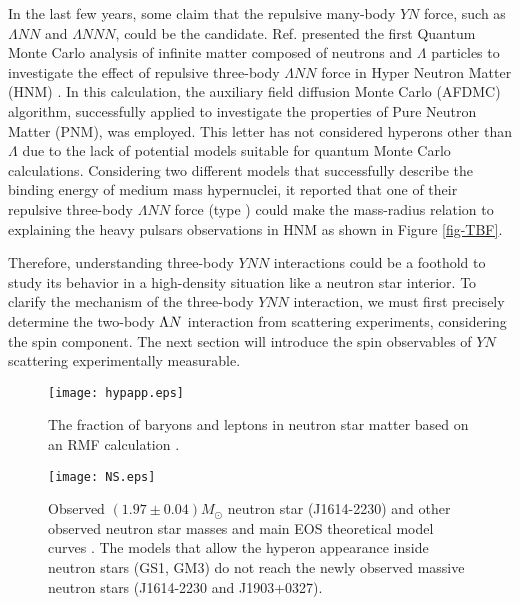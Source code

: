 In the last few years, some claim that the repulsive many-body $YN$ force, such as $\Lambda NN$ and $\Lambda NNN$, could be the candidate. Ref. \cite{Schmidt-1999} presented the first Quantum Monte Carlo analysis of infinite matter composed of neutrons and $\Lambda$ particles to investigate the effect of repulsive three-body $\Lambda NN$ force in Hyper Neutron Matter (HNM) \cite{Diego-2015}. In this calculation, the auxiliary field diffusion Monte Carlo (AFDMC) algorithm, successfully applied to investigate the properties of Pure Neutron Matter (PNM), was employed. This letter has not considered hyperons other than $\Lambda$ due to the lack of potential models suitable for quantum Monte Carlo calculations. Considering two different models that successfully describe the binding energy of medium mass hypernuclei, it reported that one of their repulsive three-body $\Lambda NN$ force (type ) could make the mass-radius relation to explaining the heavy pulsars observations in HNM as shown in Figure \ref{fig-TBF}.

Therefore, understanding three-body $YNN$ interactions could be a foothold to study its behavior in a high-density situation like a neutron star interior. To clarify the mechanism of the three-body $YNN$ interaction, we must first precisely determine the two-body $\Lambda N$ interaction from scattering experiments, considering the spin component. The next section will introduce the spin observables of $YN$ scattering experimentally measurable.

\begin{figure}[h]
  \begin{center}
   \texttt{[image: hypapp.eps]}
   \caption{The fraction of baryons and leptons in neutron star matter based on an RMF calculation \cite{RMF-2008}.}
   \label{fig-hypapp}
 \end{center}
\end{figure}

\begin{figure}[h]
  \begin{center}
   \texttt{[image: NS.eps]}
   \caption{Observed $(1.97\pm0.04)M_{\odot}$ neutron star (J1614-2230) and other observed neutron star masses and main EOS theoretical model curves \cite{NS-1}. The models that allow the hyperon appearance inside neutron stars (GS1, GM3) do not reach the newly observed massive neutron stars (J1614-2230 and J1903+0327).}
   \label{fig-NS}
 \end{center}
\end{figure}

